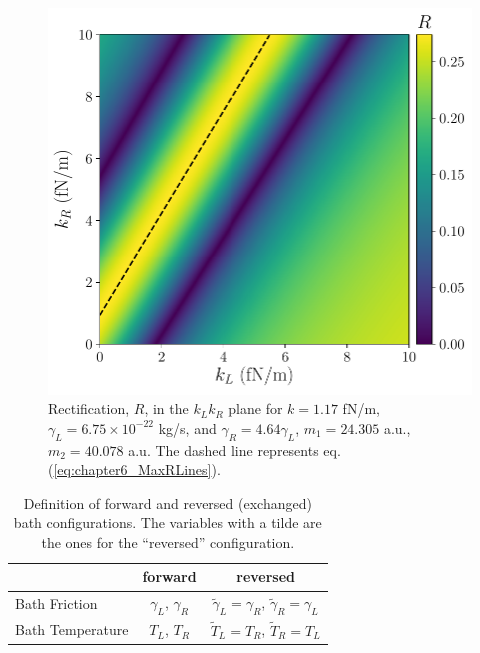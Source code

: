 \begin{figure}
  \center
  \includegraphics[width=0.75\linewidth]{Figures/RwMPlota.pdf}
  \caption{Rectification, $R$, in the $k_L k_R$ plane for $k = 1.17$ fN/m, $\gamma_L = 6.75\times 10^{-22}$ kg/s, and $\gamma_R = 4.64\gamma_L$, $m_1 = 24.305$ a.u., $m_2 = 40.078$ a.u. The dashed  line represents eq.  (\ref{eq:chapter6_MaxRLines}).}
  \label{fig:Fig_rectification_K_plane}
\end{figure}

\begin{table}[]
\center
\caption{Definition of forward and reversed (exchanged) bath configurations. The variables with a tilde are the ones for the ``reversed'' configuration.}
\begin{tabular}{lcc}
\hline
& forward                & reversed                                                       \\ \hline
Bath Friction    & $\gamma_L$, $\gamma_R$ & $\tilde{\gamma}_L =\gamma_R $,  $\tilde{\gamma}_R =\gamma_L $   \\
Bath Temperature & $T_L$, $T_R$           & $\tilde{T}_L =T_R $,  $\tilde{T}_R =T_L $                     \\
\hline
\end{tabular}
\label{tab:reversed_bath}
\end{table}
%
%
